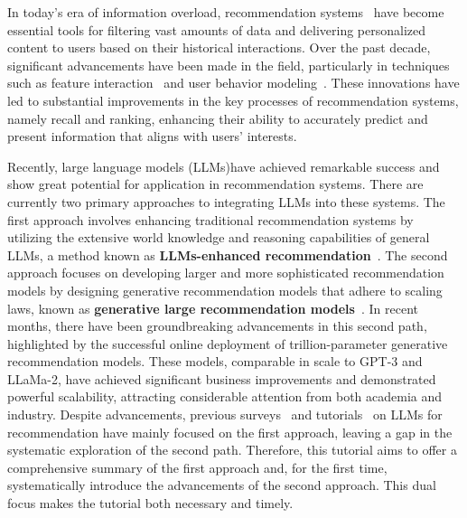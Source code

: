 In today's era of information overload, recommendation systems~\cite{xie2024breaking,xie2024bridging,shen2024exploring,yin2024learning,han2024efficient,wang2025mf,yin2023apgl4sr,han2023guesr,zhang2022clustering,wang2021hypersorec,wang2019mcne,zhang2024unified} have become essential tools for filtering vast amounts of data and delivering personalized content to users based on their historical interactions. Over the past decade, significant advancements have been made in the field, particularly in techniques such as feature interaction~\cite{wang2021dcn,guo2017deepfm} and user behavior modeling~\cite{zhou2018deep,zhou2019deep,xu2024multi}. These innovations have led to substantial improvements in the key processes of recommendation systems, namely recall and ranking, enhancing their ability to accurately predict and present information that aligns with users' interests.

Recently, large language models (LLMs)have achieved remarkable success and show great potential for application in recommendation systems. There are currently two primary approaches to integrating LLMs into these systems. The first approach involves enhancing traditional recommendation systems by utilizing the extensive world knowledge and reasoning capabilities of general LLMs, a method known as \textbf{LLMs-enhanced recommendation}~\cite{xi2024towards,liu2024once,li2023ctrl}. The second approach focuses on developing larger and more sophisticated recommendation models by designing generative recommendation models that adhere to scaling laws, known as \textbf{generative large recommendation models}~\cite{zhang2024wukong,zhang2024scaling,zhai2024actions}. In recent months, there have been groundbreaking advancements in this second path, highlighted by the successful online deployment of trillion-parameter generative recommendation models. These models, comparable in scale to GPT-3 and LLaMa-2, have achieved significant business improvements and demonstrated powerful scalability, attracting considerable attention from both academia and industry. Despite advancements, previous surveys~\cite{lin2023can,wu2024survey} and tutorials~\cite{zhang2024large,liu2023user} on LLMs for recommendation have mainly focused on the first approach, leaving a gap in the systematic exploration of the second path. Therefore, this tutorial aims to offer a comprehensive summary of the first approach and, for the first time, systematically introduce the advancements of the second approach. This dual focus makes the tutorial both necessary and timely.

